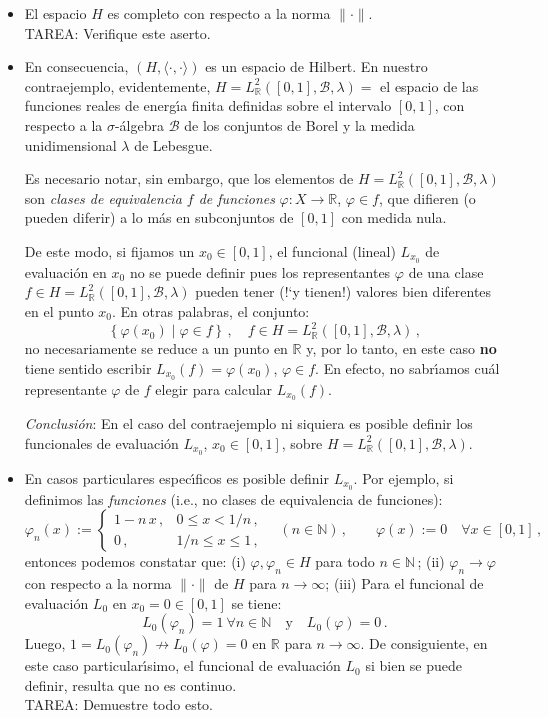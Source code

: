 \documentclass[12pt,reqno]{amsart}
\begin{document}
\begin{enumerate}
\begin{itemize}
\item
El espacio $H$ es completo con respecto a la norma $\|\cdot\|$.\\
TAREA: Verifique este aserto.

\item
En consecuencia, $(H,\langle\cdot,\cdot\rangle)$ es un espacio de
Hilbert.
En nuestro contraejemplo, evidentemente, 
$H=L_{\mathbb{R}}^2([0,1],\mathcal{B},\lambda)=$ el espacio de las
funciones reales de energ\'\i a finita definidas sobre el intervalo
$[0,1]$, con respecto a la $\sigma$-\'algebra $\mathcal{B}$ de los
conjuntos de Borel y la medida unidimensional $\lambda$ de Lebesgue.

Es necesario notar, sin embargo, que los elementos de
$H=L_{\mathbb{R}}^2([0,1],\mathcal{B},\lambda)$
son {\em clases de equivalencia $f$ de funciones\/}
$\varphi:X\to\mathbb{R}$, $\varphi\in f$, que difieren (o pueden diferir)
a lo m\'as en subconjuntos de $[0,1]$ con medida nula.

De este modo, si fijamos un $x_0\in[0,1]$, el funcional (lineal)
$L_{x_0}$ de evaluaci\'on en $x_0$ no se puede definir pues los
representantes $\varphi$ de una clase
$f\in H=L_{\mathbb{R}}^2([0,1],\mathcal{B},\lambda)$
pueden tener (!`y tienen!) valores bien diferentes en el punto $x_0$.
En otras palabras, el conjunto:
$$
\left\{ \varphi(x_0)\mid \varphi\in f \right\}\,,\quad
f\in H=L_{\mathbb{R}}^2([0,1],\mathcal{B},\lambda)\,,
$$
no necesariamente se reduce a un punto en $\mathbb{R}$ y, 
por lo tanto, en este caso {\bf no} tiene sentido escribir
$L_{x_0}(f)=\varphi(x_0)$, $\varphi\in f$.
En efecto, no sabr\'\i amos cu\'al representante $\varphi$ de $f$
elegir para calcular $L_{x_0}(f)$.

\smallskip
{\em Conclusi\'on\/}: En el caso del contraejemplo ni siquiera es
posible definir los funcionales de evaluaci\'on $L_{x_0}$,
$x_0\in[0,1]$, sobre $H=L_{\mathbb{R}}^2([0,1],\mathcal{B},\lambda)$.

\item
En casos particulares espec\'\i ficos es posible definir $L_{x_0}$.
Por ejemplo, si definimos las {\em funciones\/} (i.e., no clases
de equivalencia de funciones):
$$
\varphi_n(x):=
\begin{cases}
1-n\,x\,, & 0\leq x< 1/n\,, \\
0\,, & 1/n\leq x\leq 1\,,
\end{cases}
\quad (n\in\mathbb{N})\,,\qquad
\varphi(x):=0\quad\forall x\in[0,1]\,,
$$
entonces podemos constatar que:
(i) $\varphi,\varphi_n\in H$ para todo $n\in\mathbb{N}\,$;
(ii) $\varphi_n\to \varphi$ con respecto a la norma $\|\cdot\|$
     de $H$ para $n\to\infty$;
(iii) Para el funcional de evaluaci\'on $L_0$ en $x_0=0\in[0,1]$
      se tiene:
$$
L_0(\varphi_n)=1\ \forall n\in\mathbb{N}\quad\text{y}\quad
L_0(\varphi)=0\,.
$$
Luego, $1=L_0(\varphi_n)\not\to L_0(\varphi)=0$ en $\mathbb{R}$
para $n\to\infty$.
De consiguiente, en este caso particular\'\i simo, el funcional de
evaluaci\'on $L_0$ si bien se puede definir, resulta que no es
continuo. \\
TAREA: Demuestre todo esto.


\end{itemize}
\end{enumerate}
\end{document}
